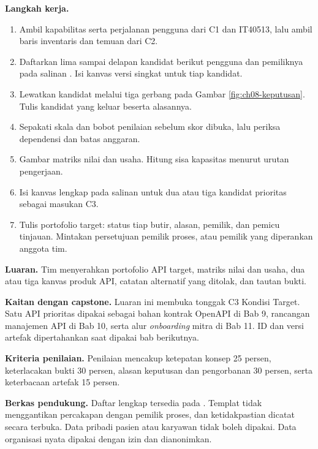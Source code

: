\textbf{Langkah kerja.}
\begin{enumerate}
  \item Ambil kapabilitas serta perjalanan pengguna dari C1 dan IT40513, lalu ambil baris inventaris dan temuan dari C2.
  \item Daftarkan lima sampai delapan kandidat berikut pengguna dan pemiliknya pada salinan . Isi kanvas versi singkat
        untuk tiap kandidat.
  \item Lewatkan kandidat melalui tiga gerbang pada Gambar \ref{fig:ch08-keputusan}. Tulis kandidat yang keluar beserta alasannya.
  \item Sepakati skala dan bobot penilaian sebelum skor dibuka, lalu periksa dependensi dan batas anggaran.
  \item Gambar matriks nilai dan usaha. Hitung sisa kapasitas menurut urutan pengerjaan.
  \item Isi kanvas lengkap pada salinan  untuk dua atau tiga kandidat prioritas sebagai masukan C3.
  \item Tulis portofolio target: status tiap butir, alasan, pemilik, dan pemicu tinjauan. Mintakan persetujuan pemilik proses, atau pemilik yang diperankan anggota tim.
\end{enumerate}

\textbf{Luaran.} Tim menyerahkan portofolio API target, matriks nilai dan usaha, dua atau tiga kanvas produk API, catatan alternatif yang ditolak, dan tautan bukti.

\textbf{Kaitan dengan capstone.} Luaran ini membuka tonggak C3 Kondisi Target. Satu API prioritas dipakai sebagai bahan kontrak OpenAPI di Bab 9, rancangan manajemen API di
Bab 10, serta alur \textit{onboarding} mitra di Bab 11. ID dan versi artefak dipertahankan saat dipakai bab berikutnya.

\textbf{Kriteria penilaian.} Penilaian mencakup ketepatan konsep 25 persen, keterlacakan bukti 30 persen, alasan keputusan dan pengorbanan 30 persen, serta keterbacaan artefak 15 persen.

\textbf{Berkas pendukung.} Daftar lengkap tersedia pada . Templat tidak menggantikan percakapan dengan pemilik proses, dan ketidakpastian dicatat
secara terbuka. Data pribadi pasien atau karyawan tidak boleh dipakai. Data organisasi nyata dipakai dengan izin dan dianonimkan.


